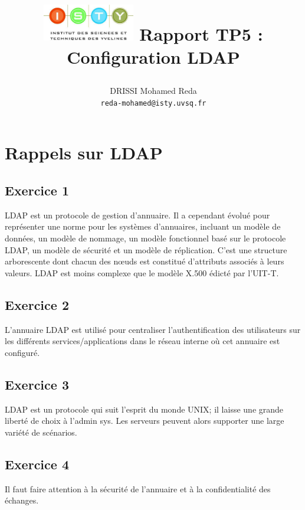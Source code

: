 \documentclass{report}
\begin{document}
\title{
  \begin{minipage}\linewidth
      \centering
      \includegraphics[width=40mm]{resources/01.png}\vskip 20pt
      Rapport TP5 : Configuration LDAP
      \vskip 5pt
      \author{
        DRISSI Mohamed Reda \\
        \texttt{reda-mohamed@isty.uvsq.fr}
      }
    \end{minipage}
}
\maketitle
\newpage
\tableofcontents
\newpage
\section{Rappels sur LDAP}
\subsection{Exercice 1}
LDAP est un protocole de gestion d'annuaire. Il a cependant évolué pour représenter une norme pour les systèmes d'annuaires,
incluant un modèle de données, un modèle de nommage, un modèle fonctionnel basé sur le protocole LDAP,
un modèle de sécurité et un modèle de réplication. C'est une structure arborescente dont chacun des nœuds est
constitué d'attributs associés à leurs valeurs. LDAP est moins complexe que le modèle X.500 édicté par l'UIT-T.
\subsection{Exercice 2}
L'annuaire LDAP est utilisé pour centraliser l'authentification des utilisateurs sur les différents services/applications
dans le réseau interne où cet annuaire est configuré.
\subsection{Exercice 3}
LDAP est un protocole qui suit l'esprit du monde UNIX; il laisse une grande liberté de choix à l'admin sys. Les serveurs
peuvent alors supporter une large variété de scénarios.
\subsection{Exercice 4}
Il faut faire attention à la sécurité de l'annuaire et à la confidentialité des échanges.
\end{document}
